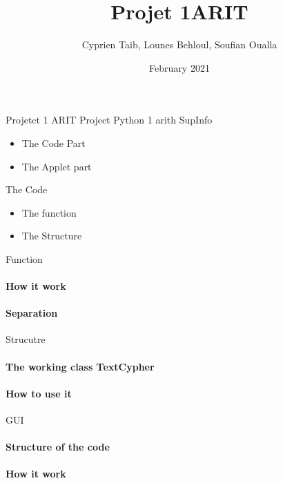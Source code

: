 \documentclass{beamer}
\title{Projet 1ARIT}
\author{Cyprien Taib, Lounes Behloul, Soufian Oualla}
\date{February 2021}
\begin{document}
    \begin{frame}{Projetct 1 ARIT}
        \Large Project Python 1 arith SupInfo
        \begin{center}
            \small{
                \begin{itemize}
                    \item The Code Part 
                    \item The Applet part 
                \end{itemize}
            }
        \end{center}
	\end{frame}
    
    \begin{frame}{The Code }
        \begin{center}
            \small{
                \begin{itemize}
                    \item The function 
                    \item The Structure
                \end{itemize}
            }
        \end{center}

    \end{frame}

    \begin{frame}{Function}
        \paragraph{How it work}
        \paragraph{Separation}
        
    \end{frame}

    \begin{frame}{Strucutre}
        \paragraph{The working class TextCypher}
        \paragraph{How to use it}
    \end{frame}

    \begin{frame}{GUI}
        \paragraph{Structure of the code}
        \paragraph{How it work}

    \end{frame}
\end{document}
